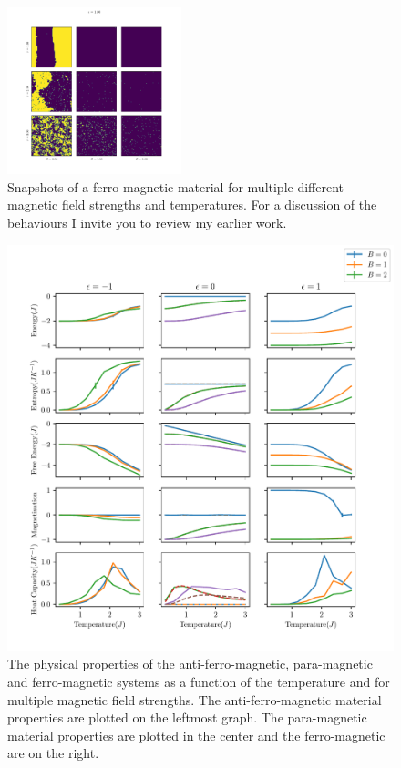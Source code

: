 \documentclass[a4paper, twocolumn]{article}
\begin{document}
\begin{figure}[h]
    \centering
    \includegraphics[width=0.45\textwidth]{pub/figures/external_field_epsilon_one.pdf}
    \caption{Snapshots of a ferro-magnetic material for multiple %
        different magnetic field strengths and temperatures. For a %
        discussion of the behaviours I invite you to review my earlier %
        work.}
    \label{fig:10}
\end{figure}


\begin{figure}
    \centering
    \includegraphics{pub/figures/physical_parameters_external_field.pdf}
    \caption{The physical properties of the anti-ferro-magnetic, para-magnetic %
        and ferro-magnetic systems as a function of the temperature and %
        for multiple magnetic field strengths. The anti-ferro-magnetic %
        material properties are plotted on the leftmost graph. The %
        para-magnetic material properties are plotted in the center and %
        the ferro-magnetic are on the right.}
    \label{fig:11}
\end{figure}
\end{document}
